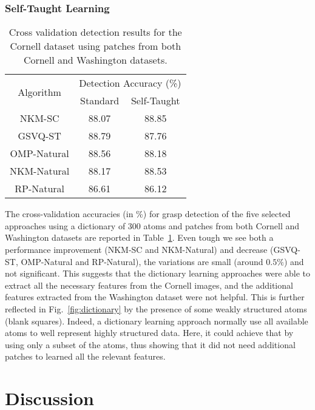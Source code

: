 \documentclass[svgnames]{scrartcl}
\begin{document}
\subsubsection{Self-Taught Learning}

\begin{table}[t]
\caption{Cross validation detection results for the Cornell dataset using patches from both Cornell and Washington datasets.}
\begin{center}
\begin{tabular}{c|cc}
\hline \hline
\multirow{2}{*}{Algorithm} & \multicolumn{2}{c}{Detection Accuracy (\%)} \\
& Standard & Self-Taught \\
\hline
NKM-SC & 88.07 & 88.85 \\
GSVQ-ST & 88.79 & 87.76 \\
OMP-Natural & 88.56 & 88.18 \\
NKM-Natural &  88.17 & 88.53 \\
RP-Natural & 86.61 & 86.12 \\
\hline \hline
\end{tabular}
\end{center}
\label{tab:detection_results_selftaught}
\end{table}

The cross-validation accuracies (in \%) for grasp detection of the five selected approaches using a dictionary of 300 atoms and patches from both Cornell and Washington datasets are reported in Table~\ref{tab:detection_results_selftaught}. Even tough we see both a performance improvement (NKM-SC and NKM-Natural) and decrease (GSVQ-ST, OMP-Natural and RP-Natural), the variations are small (around $0.5\%$) and not significant. This suggests that the dictionary learning approaches were able to extract all the necessary features from the Cornell images, and the additional features extracted from the Washington dataset were not helpful. This is further reflected in Fig.~\ref{fig:dictionary} by the presence of some weakly structured atoms (blank squares). Indeed, a dictionary learning approach normally use all available atoms to well represent highly structured data. Here, it could achieve that by using only a subset of the atoms, thus showing that it did not need additional patches to learned all the relevant features.


\section{Discussion}
\label{sec:discussion}
\end{document}
